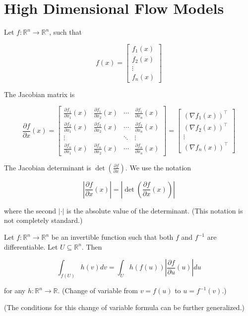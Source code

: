 \documentclass{report}
\begin{document}
\section{High Dimensional Flow Models}

\begin{concept}
    Let $f: \mathbb{R}^{n} \rightarrow \mathbb{R}^{n}$, such that

    $$
    f(x)=\left[\begin{array}{c}
    f_{1}(x) \\
    f_{2}(x) \\
    \vdots \\
    f_{n}(x)
    \end{array}\right]
    $$

    The Jacobian matrix is

    $$
    \frac{\partial f}{\partial x}(x)=\left[\begin{array}{cccc}
    \frac{\partial f_{1}}{\partial x_{1}}(x) & \frac{\partial f_{1}}{\partial x_{2}}(x) & \cdots & \frac{\partial f_{1}}{\partial x_{n}}(x) \\
    \frac{\partial f_{2}}{\partial x_{1}}(x) & \frac{\partial f_{2}}{\partial x_{2}}(x) & \cdots & \frac{\partial f_{2}}{\partial x_{n}}(x) \\
    \vdots & & \ddots & \vdots \\
    \frac{\partial f_{n}}{\partial x_{1}}(x) & \frac{\partial f_{n}}{\partial x_{2}}(x) & \cdots & \frac{\partial f_{n}}{\partial x_{n}}(x)
    \end{array}\right]=\left[\begin{array}{c}
    \left(\nabla f_{1}(x)\right)^{\top} \\
    \left(\nabla f_{2}(x)\right)^{\top} \\
    \vdots \\
    \left(\nabla f_{n}(x)\right)^{\top}
    \end{array}\right]
    $$

    The Jacobian determinant is $\operatorname{det}\left(\frac{\partial f}{\partial x}\right)$. We use the notation

    $$
    \left|\frac{\partial f}{\partial x}(x)\right|=\left|\operatorname{det}\left(\frac{\partial f}{\partial x}(x)\right)\right|
    $$

    where the second $|\cdot|$ is the absolute value of the determinant. (This notation is not completely standard.)
\end{concept}

\begin{concept}
    Let $f: \mathbb{R}^{n} \rightarrow \mathbb{R}^{n}$ be an invertible function such that both $f$ and $f^{-1}$ are differentiable. Let $U \subseteq \mathbb{R}^{n}$. Then

    $$
    \int_{f(U)} h(v) d v=\int_{U} h(f(u))\left|\frac{\partial f}{\partial u}(u)\right| d u
    $$

    for any $h: \mathbb{R}^{n} \rightarrow \mathbb{R}$. (Change of variable from $v=f(u)$ to $u=f^{-1}(v)$.)

    (The conditions for this change of variable formula can be further generalized.)
\end{concept}
\end{document}
